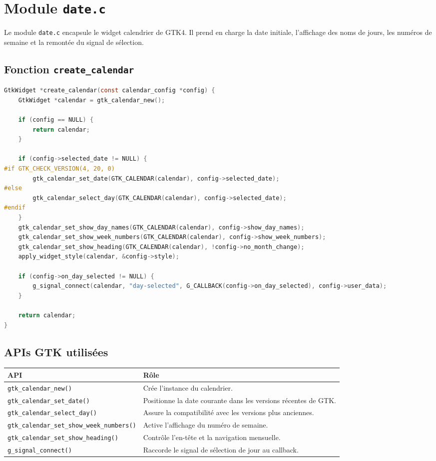 \section{Module \texttt{date.c}}

Le module \texttt{date.c} encapsule le widget calendrier de GTK4. Il prend en charge la date initiale, l'affichage des noms de jours, les numéros de semaine et la remontée du signal de sélection.

\subsection{Fonction \texttt{create\_calendar}}

\begin{lstlisting}[language=C]
GtkWidget *create_calendar(const calendar_config *config) {
    GtkWidget *calendar = gtk_calendar_new();

    if (config == NULL) {
        return calendar;
    }

    if (config->selected_date != NULL) {
#if GTK_CHECK_VERSION(4, 20, 0)
        gtk_calendar_set_date(GTK_CALENDAR(calendar), config->selected_date);
#else
        gtk_calendar_select_day(GTK_CALENDAR(calendar), config->selected_date);
#endif
    }
    gtk_calendar_set_show_day_names(GTK_CALENDAR(calendar), config->show_day_names);
    gtk_calendar_set_show_week_numbers(GTK_CALENDAR(calendar), config->show_week_numbers);
    gtk_calendar_set_show_heading(GTK_CALENDAR(calendar), !config->no_month_change);
    apply_widget_style(calendar, &config->style);

    if (config->on_day_selected != NULL) {
        g_signal_connect(calendar, "day-selected", G_CALLBACK(config->on_day_selected), config->user_data);
    }

    return calendar;
}
\end{lstlisting}

\subsection{APIs GTK utilisées}

\begin{center}
\begin{tabular}{|l|p{8cm}|}
\hline
\textbf{API} & \textbf{Rôle} \\
\hline
\texttt{gtk\_calendar\_new()} & Crée l'instance du calendrier. \\
\hline
\texttt{gtk\_calendar\_set\_date()} & Positionne la date courante dans les versions récentes de GTK. \\
\hline
\texttt{gtk\_calendar\_select\_day()} & Assure la compatibilité avec les versions plus anciennes. \\
\hline
\texttt{gtk\_calendar\_set\_show\_week\_numbers()} & Active l'affichage du numéro de semaine. \\
\hline
\texttt{gtk\_calendar\_set\_show\_heading()} & Contrôle l'en-tête et la navigation mensuelle. \\
\hline
\texttt{g\_signal\_connect()} & Raccorde le signal de sélection de jour au callback. \\
\hline
\end{tabular}
\end{center}

\newpage
